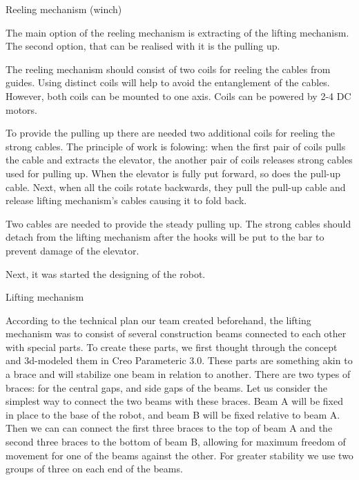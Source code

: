 \begin{enumerate*}
\begin{enumerate*}
\begin{enumerate*}
  	\end{enumerate*}
  	
  	\item Reeling mechanism (winch)
  	\begin{enumerate*}
  		\item The main option of the reeling mechanism is extracting of the lifting mechanism. The second option, that can be realised with it is the pulling up.
  		
  		\item The reeling mechanism should consist of two coils for reeling the cables from guides. Using distinct coils will help to avoid the entanglement of the cables. However, both coils can be mounted to one axis. Coils can be powered by 2-4 DC motors.
  		
  		\item To provide the pulling up there are needed two additional coils for reeling the strong cables. The principle of work is folowing: when the first pair of coils pulls the cable and extracts the elevator, the another pair of coils releases strong cables used for pulling up. When the elevator is fully put forward, so does the pull-up cable. Next, when all the coils rotate backwards, they pull the pull-up cable and release lifting mechanism's cables causing it to fold back.
  		
  		\item Two cables are needed to provide the steady pulling up. The strong cables should detach from the lifting mechanism after the hooks will be put to the bar to prevent damage of the elevator.
  		
  	\end{enumerate*}
  	
  \end{enumerate*}

  \item Next, it was started the designing of the robot.

  \begin{enumerate*}
    \item Lifting mechanism
    \begin{enumerate*}
       \item According to the technical plan our team created beforehand, the lifting mechanism was to consist of several construction beams connected to each other with special parts. To create these parts, we first thought through the concept and 3d-modeled them in Creo Parameteric 3.0. These parts are something akin to a brace and will stabilize one beam in relation to another. There are two types of braces: for the central gaps, and side gaps of the beams. Let us consider the simplest way to connect the two beams with these braces. Beam A will be fixed in place to the base of the robot, and beam B will be fixed relative to beam A. Then we can can connect the first three braces to the top of beam A and the second three braces to the bottom of beam B, allowing for maximum freedom of movement for one of the beams against the other. For greater stability we use two groups of three on each end of the beams.


\end{enumerate*}
\end{enumerate*}
\end{enumerate*}
